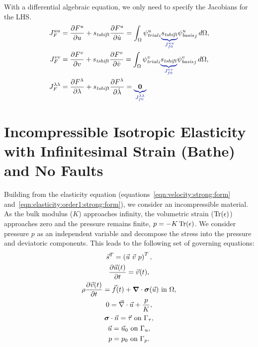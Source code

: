 With a differential algebraic equation, we only need to specify the Jacobians for the LHS.
\begin{align}
  J_F^{uu} &= \frac{\partial F^u}{\partial u} + s_\mathit{tshift} \frac{\partial F^u}{\partial \dot{u}}
  = \int_\Omega \trialscalar[u]_i \eqnannotate{s_\mathit{tshift}}{J_{f0}^{uu}} \basisscalar[u]_j \, d\Omega, \\
%
  J_F^{vv} &= \frac{\partial F^v}{\partial v}  + s_\mathit{tshift} \frac{\partial F^v}{\partial \dot{v}}
  = \int_\Omega \trialscalar[v]_i \eqnannotate{s_\mathit{tshift}}{J_{f0}^{vv}} \basisscalar[v]_j \, d\Omega, \\
%
  J_F^{\lambda \lambda} &= \frac{\partial F^\lambda}{\partial \lambda} + s_\mathit{tshift} \frac{\partial F^\lambda}{\partial \dot{\lambda}}
  = \eqnannotate{\tensor{0}}{J_{f0}^{\lambda \lambda}}
\end{align}

\section{Incompressible Isotropic Elasticity with Infinitesimal Strain (Bathe) and No Faults}


Building from the elasticity equation
(equations~\ref{eqn:velocity:strong:form}
and~\ref{eqn:elasticity:order1:strong:form}), we consider an
incompressible material. As the bulk modulus ($K$) approaches
infinity, the volumetric strain ($\operatorname{Tr}(\epsilon)$) approaches zero and
the pressure remains finite, $p = -K \operatorname{Tr}(\epsilon)$. We consider
pressure $p$ as an independent variable and decompose the stress into the
pressure and deviatoric components. This leads to the following set of
governing equations:
\begin{gather}
  \vec{s}^T = \left( \vec{u} \ \vec{v} \ p \right)^T, \\
  \frac{\partial\vec{u}(t)}{\partial t} = \vec{v}(t), \\
  \rho \frac{\partial\vec{v}(t)}{\partial t} = \vec{f}(t) + \bm{\nabla} \cdot 
\bm{\sigma}(\vec{u}) 
\text{ in }\Omega, \\
  0 = \vec{\nabla} \cdot \vec{u} + \frac{p}{K}, \\
  \bm{\sigma} \cdot \vec{n} = \vec{\tau} \text{ on }\Gamma_\tau, \\
  \vec{u} = \vec{u}_0 \text{ on }\Gamma_u, \\
  p = p_0 \text{ on }\Gamma_p.
\end{gather}

